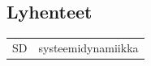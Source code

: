 \documentclass[finnish,12pt,a4paper,pdftex]{article}
\begin{document}
%
%

\subsection*{Lyhenteet}

\begin{tabular}{ll}
SD         & systeemidynamiikka \\
\end{tabular}


\cleardoublepage
\storeinipagenumber
{}
\setcounter{page}{1}


\end{document}
